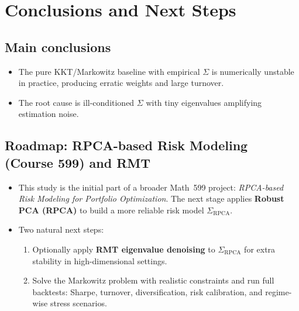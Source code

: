\documentclass[11pt]{article}
\begin{document}
	\newpage
	
	\section{Conclusions and Next Steps}
	\subsection{Main conclusions}
	\begin{itemize}
		\item The pure KKT/Markowitz baseline with empirical $\Sigma$ is numerically unstable in practice, producing erratic weights and large turnover.
		\item The root cause is ill-conditioned $\Sigma$ with tiny eigenvalues amplifying estimation noise.
	\end{itemize}
	
	\subsection{Roadmap: RPCA-based Risk Modeling (Course 599) and RMT}
	\begin{itemize}
		\item This study is the initial part of a broader Math~599 project: \emph{RPCA-based Risk Modeling for Portfolio Optimization}. The next stage applies \textbf{Robust PCA (RPCA)} to build a more reliable risk model $\Sigma_{\mathrm{RPCA}}$.
		\item Two natural next steps:
		\begin{enumerate}
			\item Optionally apply \textbf{RMT eigenvalue denoising} to $\Sigma_{\mathrm{RPCA}}$ for extra stability in high-dimensional settings.
			\item Solve the Markowitz problem with realistic constraints and run full backtests: Sharpe, turnover, diversification, risk calibration, and regime-wise stress scenarios.
		\end{enumerate}
	\end{itemize}
	
\end{document}
